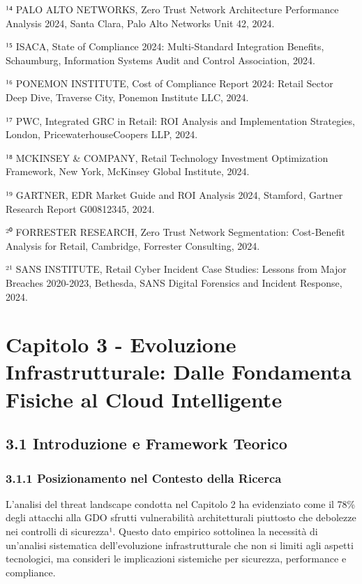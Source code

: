 \documentclass[12pt,a4paper,oneside]{book}
\numberwithin{figure}{chapter} %
\numberwithin{table}{chapter}  %
\begin{document}
¹⁴ PALO ALTO NETWORKS, Zero Trust Network Architecture Performance
Analysis 2024, Santa Clara, Palo Alto Networks Unit 42, 2024.

¹⁵ ISACA, State of Compliance 2024: Multi-Standard Integration Benefits,
Schaumburg, Information Systems Audit and Control Association, 2024.

¹⁶ PONEMON INSTITUTE, Cost of Compliance Report 2024: Retail Sector Deep
Dive, Traverse City, Ponemon Institute LLC, 2024.

¹⁷ PWC, Integrated GRC in Retail: ROI Analysis and Implementation
Strategies, London, PricewaterhouseCoopers LLP, 2024.

¹⁸ MCKINSEY \& COMPANY, Retail Technology Investment Optimization
Framework, New York, McKinsey Global Institute, 2024.

¹⁹ GARTNER, EDR Market Guide and ROI Analysis 2024, Stamford, Gartner
Research Report G00812345, 2024.

²⁰ FORRESTER RESEARCH, Zero Trust Network Segmentation: Cost-Benefit
Analysis for Retail, Cambridge, Forrester Consulting, 2024.

²¹ SANS INSTITUTE, Retail Cyber Incident Case Studies: Lessons from
Major Breaches 2020-2023, Bethesda, SANS Digital Forensics and Incident
Response, 2024.

\chapter{Capitolo 3 - Evoluzione Infrastrutturale: Dalle Fondamenta
Fisiche al Cloud
Intelligente}\label{capitolo-3---evoluzione-infrastrutturale-dalle-fondamenta-fisiche-al-cloud-intelligente}

\section{3.1 Introduzione e Framework
Teorico}\label{introduzione-e-framework-teorico}

\subsection{3.1.1 Posizionamento nel Contesto della
Ricerca}\label{posizionamento-nel-contesto-della-ricerca}

L'analisi del threat landscape condotta nel Capitolo 2 ha evidenziato
come il 78\% degli attacchi alla GDO sfrutti vulnerabilità
architetturali piuttosto che debolezze nei controlli di sicurezza¹.
Questo dato empirico sottolinea la necessità di un'analisi sistematica
dell'evoluzione infrastrutturale che non si limiti agli aspetti
tecnologici, ma consideri le implicazioni sistemiche per sicurezza,
performance e compliance.
\end{document}
